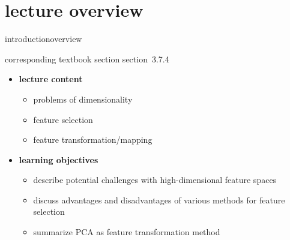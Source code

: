 

\subtitle{Module 3.7.4: Feature Dimensionality Reduction}


	

    \section[overview]{lecture overview}
        \begin{frame}{introduction}{overview}
            \begin{block}{corresponding textbook section}
                    section~3.7.4
            \end{block}

            \begin{itemize}
                \item   \textbf{lecture content}
                    \begin{itemize}
                        \item   problems of dimensionality
                        \item   feature selection
                        \item   feature transformation/mapping
                    \end{itemize}
                \bigskip
                \item<2->   \textbf{learning objectives}
                    \begin{itemize}
                        \item   describe potential challenges with high-dimensional feature spaces
                        \item   discuss advantages and disadvantages of various methods for feature selection
                        \item   summarize PCA as feature transformation method
                    \end{itemize}
            \end{itemize}
        \end{frame}

